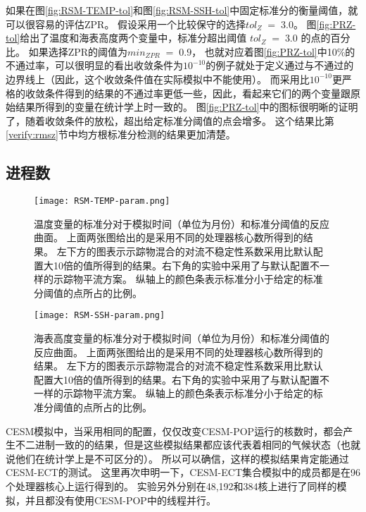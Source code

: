 如果在图\ref{fig:RSM-TEMP-tol}和图\ref{fig:RSM-SSH-tol}中固定标准分的衡量阈值，就可以很容易的评估ZPR。 
假设采用一个比较保守的选择$tol_{Z} \; = \; 3.0$。 
图\ref{fig:PRZ-tol}给出了温度和海表高度两个变量中，标准分超出阈值 $tol_{Z} \; = \; 3.0$ 的点的百分比。 
如果选择ZPR的阈值为$min_{ZPR} \; = \; 0.9$， 也就对应着图\ref{fig:PRZ-tol}中10\%的不通过率，可以很明显的看出收敛条件为$10^{-10}$的例子就处于定义通过与不通过的边界线上（因此，这个收敛条件值在实际模拟中不能使用）。 
而采用比$10^{-10}$更严格的收敛条件得到的结果的不通过率更低一些，因此，看起来它们的两个变量跟原始结果所得到的变量在统计学上时一致的。
图\ref{fig:PRZ-tol}中的图标很明晰的证明了，随着收敛条件的放松，超出给定标准分阈值的点会增多。 
这个结果比第\ref{verify:rmsz}节中均方根标准分检测的结果更加清楚。 



\subsection{进程数}\label{verify:proc}
\begin {figure}[!ht]
\centering
\texttt{[image: RSM-TEMP-param.png]}
\caption {
温度变量的标准分对于模拟时间（单位为月份）和标准分阈值的反应曲面。
上面两张图给出的是采用不同的处理器核心数所得到的结果。
左下方的图表示示踪物混合的对流不稳定性系数采用比默认配置大10倍的值所得到的结果。右下角的实验中采用了与默认配置不一样的示踪物平流方案。
纵轴上的颜色条表示标准分小于给定的标准分阈值的点所占的比例。}
\label{fig:RSM-TEMP-param}
\end {figure}
 
\begin{figure} [!ht]
\centering
\texttt{[image: RSM-SSH-param.png]}
\caption {
海表高度变量的标准分对于模拟时间（单位为月份）和标准分阈值的反应曲面。
上面两张图给出的是采用不同的处理器核心数所得到的结果。
左下方的图表示示踪物混合的对流不稳定性系数采用比默认配置大10倍的值所得到的结果。右下角的实验中采用了与默认配置不一样的示踪物平流方案。
纵轴上的颜色条表示标准分小于给定的标准分阈值的点所占的比例。}
\label{fig:RSM-SSH-param}
\end {figure}

CESM模拟中，当采用相同的配置，仅仅改变CESM-POP运行的核数时，都会产生不二进制一致的的结果，但是这些模拟结果都应该代表着相同的气候状态（也就说他们在统计学上是不可区分的）。
所以可以确信，这样的模拟结果肯定能通过CESM-ECT的测试。 
这里再次申明一下，CESM-ECT集合模拟中的成员都是在96个处理器核心上运行得到的。
实验另外分别在48,192和384核上进行了同样的模拟，并且都没有使用CESM-POP中的线程并行。 


